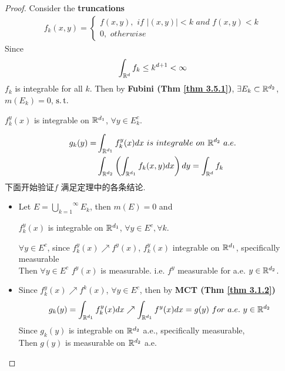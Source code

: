 \begin{thm}
		\vspace{2em}
		\begin{proof}
			Consider the \textbf{truncations}
			\begin{align}
				f_{k}(x , y) = 
				\begin{cases}
					f(x , y) , \,\, if \,\, \left| (x , y) \right| < k \,\, and \,\, f(x , y) < k \\
					0 , \,\, otherwise
				\end{cases}
			\end{align}
			Since
			\begin{align}
				\int_{\mathbb{R}^d}{f_k} \leq k^{d + 1} < \infty
			\end{align}
			$f_k$ is integrable for all $k$. Then by \textbf{Fubini (Thm \ref{thm 3.5.1})}, $\exists E_k \subset \mathbb{R}^{d_2}$, $m(E_k) = 0$, $\operatorname{s.t.}$
			\begin{center}
				$f_{k}^{y}(x)$ is integrable on $\mathbb{R}^{d_1}$, $\forall y \in E_{k}^c$.
			\end{center}
			\begin{align}
				g_{k}(y) = &\int_{\mathbb{R}^{d_1}}{f_{k}^{y}(x) dx} \,\, is \,\, integrable \,\, on \,\, \mathbb{R}^{d_2} \,\, a.e. \\
				&\int_{\mathbb{R}^{d_2}}{\left( \int_{\mathbb{R}^{d_1}}{f_{k}(x , y) dx} \right) dy}
				= \int_{\mathbb{R}^d}{f_k}
			\end{align}
			下面开始验证$f$ 满足定理中的各条结论. 
			\begin{itemize}
				\item Let $E = \overset{\infty}{\underset{k = 1}{\bigcup}}{E_k}$, then $m(E) = 0$ and
				\begin{center}
					$f_{k}^{y}(x)$ is integrable on $\mathbb{R}^{d_1}$, $\forall y \in E^c , \forall k$.
				\end{center}
				$\forall y \in E^c$, since $f_{k}^{y}(x) \nearrow f^{y}(x)$, $f_{k}^{y}(x)$ integrable on $\mathbb{R}^{d_1}$, specifically measurable\\
				Then $\forall y \in E^c$ $f^{y}(x)$ is measurable. i.e. $f^y$ measurable for a.e. $y \in \mathbb{R}^{d_2}$.
				
				\newpage
				
				\item Since $f_{k}^{y}(x) \nearrow f^{k}(x)$, $\forall y \in E^c$, then by \textbf{MCT (Thm \ref{thm 3.1.2})}
				\begin{align}
					g_{k}(y) = \int_{\mathbb{R}^{d_1}}{f_{k}^{y}(x) dx} \nearrow \int_{\mathbb{R}^{d_1}}{f^{y}(x) dx} = g(y) \,\, for \,\, a.e. \,\, y \in \mathbb{R}^{d_2}
				\end{align}
				Since $g_{k}(y)$ is integrable on $\mathbb{R}^{d_2}$ a.e., specifically measurable, \\
				Then $g(y)$ is measurable on $\mathbb{R}^{d_2}$ a.e.
				

\end{itemize}
\end{proof}
\end{thm}
